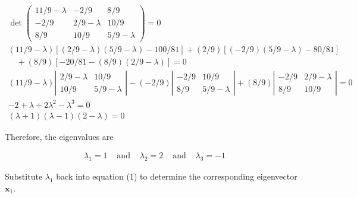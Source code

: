 \documentclass[12pt]{article}
\begin{document}
\begin{equation*}
	\begin{array}{c}
		\operatorname{det}\left(\begin{array}{ccc}
				11 / 9-\lambda & -2 / 9        & 8 / 9         \\
				-2 / 9         & 2 / 9-\lambda & 10 / 9        \\
				8 / 9          & 10 / 9        & 5 / 9-\lambda
			\end{array}\right)=0                                                                                            \\
		(11 / 9-\lambda)[(2 / 9-\lambda)(5 / 9-\lambda)-100 / 81]+(2 / 9)[(-2 / 9)(5 / 9-\lambda)-80 / 81]                                                    \\
		\quad+(8 / 9)[-20 / 81-(8 / 9)(2 / 9-\lambda)]=0                                                                                                      \\
		(11 / 9-\lambda)\left|\begin{array}{cc}
			2 / 9-\lambda & 10 / 9        \\
			10 / 9        & 5 / 9-\lambda
		\end{array}\right|-(-2 / 9)\left|\begin{array}{cc}
			-2 / 9 & 10 / 9        \\
			8 / 9  & 5 / 9-\lambda
		\end{array}\right|+(8 / 9)\left|\begin{array}{cc}
			-2 / 9 & 2 / 9-\lambda \\
			8 / 9  & 10 / 9
		\end{array}\right|=0 \\
		-2+\lambda+2 \lambda^{2}-\lambda^{3}=0                                                                                                                \\
		(\lambda+1)(\lambda-1)(2-\lambda)=0
	\end{array}
\end{equation*}

Therefore, the eigenvalues are

\begin{equation*}
	\begin{array}{|l|l|l|}
		\hline \lambda_{1}=1 & \text { and } & \lambda_{2}=2 & \text { and } & \lambda_{3}=-1
	\end{array}
\end{equation*}

Substitute \(\lambda_{1}\) back into equation (1) to determine the corresponding
eigenvector \(\mathbf{x}_{1}\). 
\end{document}
